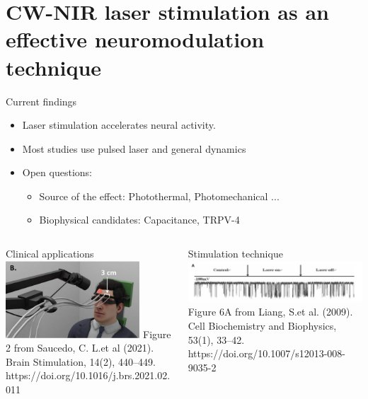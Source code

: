 \documentclass[aspectratio=43]{beamer}
\begin{document}
\section[CW-NIR Neuromodulation]{CW-NIR laser stimulation as an effective neuromodulation technique}
\begin{frame}{Current findings}
	\begin{itemize}
		\item{Laser stimulation accelerates neural activity.}
		\item{Most studies use pulsed laser and general dynamics} 
		\item{Open questions:}
		\begin{itemize}
			\item Source of the effect: Photothermal, Photomechanical ...
			\item Biophysical candidates: Capacitance, TRPV-4 
		\end{itemize}
	\end{itemize}
	\vspace{10pt}
	\begin{columns}
		\begin{column}{0.5\textwidth}
			\centering
			Clinical applications\\
			\includegraphics[width=0.8\textwidth]{Images/saucedo.png} \tiny{Figure 2 from Saucedo, C. L.et al (2021). Brain Stimulation, 14(2), 440–449. https://doi.org/10.1016/j.brs.2021.02.011}
		\end{column}
		\begin{column}{0.5\textwidth}
			\centering
			Stimulation technique\\
			\includegraphics[width=\textwidth]{Images/liang.png} \tiny{Figure 6A from Liang, S.et al. (2009). Cell Biochemistry and Biophysics, 53(1), 33–42. https://doi.org/10.1007/s12013-008-9035-2
			}
		\end{column}	
	\end{columns}
	
	
\end{frame}
\end{document}

